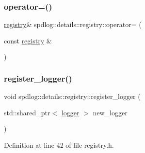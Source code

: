 \mbox{\label{classspdlog_1_1details_1_1registry_a12da238b4eda17829b194b36f383e8a0}} 
\subsubsection{\texorpdfstring{operator=()}{operator=()}}
{\footnotesize\ttfamily \hyperlink{classspdlog_1_1details_1_1registry}{registry}\& spdlog\+::details\+::registry\+::operator= (\begin{DoxyParamCaption}\item[{const \hyperlink{classspdlog_1_1details_1_1registry}{registry} \&}]{ }\end{DoxyParamCaption})\hspace{0.3cm}{\ttfamily [delete]}}

\mbox{\label{classspdlog_1_1details_1_1registry_ab77fb7513b2e3e6442a83f037543e391}} 
\subsubsection{\texorpdfstring{register\+\_\+logger()}{register\_logger()}}
{\footnotesize\ttfamily void spdlog\+::details\+::registry\+::register\+\_\+logger (\begin{DoxyParamCaption}\item[{std\+::shared\+\_\+ptr$<$ \hyperlink{classspdlog_1_1logger}{logger} $>$}]{new\+\_\+logger }\end{DoxyParamCaption})\hspace{0.3cm}{\ttfamily [inline]}}



Definition at line 42 of file registry.\+h.

